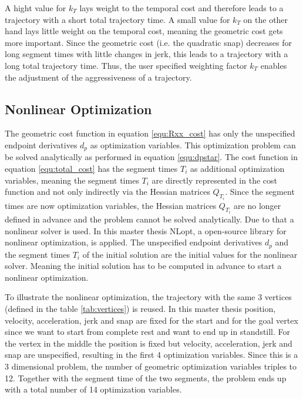 A hight value for $k_T$ lays weight to the temporal cost and therefore leads to a trajectory with a short total trajectory time. A small value for $k_T$ on the other hand lays little weight on the temporal cost, meaning the geometric cost gets more important. Since the geometric cost (i.e. the quadratic snap) decreases for long segment times with little changes in jerk, this leads to a trajectory with a long total trajectory time. Thus, the user specified weighting factor $k_T$ enables the adjustment of the aggressiveness of a trajectory. \newline

\subsection{Nonlinear Optimization}\label{sec:nonlinearopt}

The geometric cost function in equation \ref{equ:Rxx_cost} has only the unspecified endpoint derivatives $d_p$ as optimization variables. This optimization problem can be solved analytically as performed in equation \ref{equ:dpstar}. The cost function in equation \ref{equ:total_cost} has the segment times $T_i$ as additional optimization variables, meaning the segment times $T_i$ are directly represented in the cost function and not only indirectly via the Hessian matrices $Q_{T_i}$. Since the segment times are now optimization variables, the Hessian matrices $Q_{T_i}$ are no longer defined in advance and the problem cannot be solved analytically. Due to that a nonlinear solver is used. In this master thesis NLopt, a open-source library for nonlinear optimization, is applied. The unspecified endpoint derivatives $d_p$ and the segment times $T_i$ of the initial solution are the initial values for the nonlinear solver. Meaning the initial solution has to be computed in advance to start a nonlinear optimization. \newline

To illustrate the nonlinear optimization, the trajectory with the same 3 vertices (defined in the table  \ref{tab:vertices}) is reused. In this master thesis position, velocity, acceleration, jerk and snap are fixed for the start and for the goal vertex since we want to start from complete rest and want to end up in standstill. For the vertex in the middle the position is fixed but velocity, acceleration, jerk and snap are unspecified, resulting in the first 4 optimization variables. Since this is a 3 dimensional problem, the number of geometric optimization variables triples to 12. Together with the segment time of the two segments, the problem ends up with a total number of 14 optimization variables. \pagebreak 


